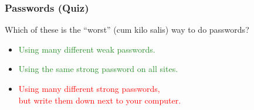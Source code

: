 \documentclass[aspectratio=169,dvipsnames]{beamer}
\begin{document}
\begin{frame}
\frametitle{Passwords (Quiz)}

Which of these is the ``worst'' (cum kilo salis) way to do passwords?
\bigskip

\begin{itemize}
\item \textcolor{ForestGreen}{Using many different weak passwords.}
\item \textcolor{ForestGreen}{Using the same strong password on all sites.}
\item \textcolor{Red}{Using many different strong passwords,\\ but write them down next to your computer.}
\end{itemize}

\end{frame}

\end{document}
